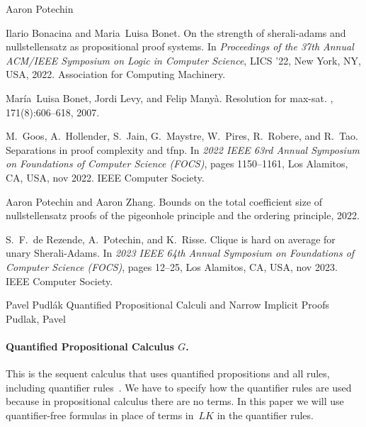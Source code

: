 \documentclass[report]{owrart}
\begin{document}
\begin{report}
\begin{talk}{Aaron Potechin}
\begin{thebibliography}{99}
Ilario Bonacina and Maria~Luisa Bonet.
\newblock On the strength of sherali-adams and nullstellensatz as propositional
  proof systems.
\newblock In {\em Proceedings of the 37th Annual ACM/IEEE Symposium on Logic in
  Computer Science}, LICS '22, New York, NY, USA, 2022. Association for
  Computing Machinery.

María~Luisa Bonet, Jordi Levy, and Felip Manyà.
\newblock Resolution for max-sat.
, 171(8):606--618, 2007.

M.~Goos, A.~Hollender, S.~Jain, G.~Maystre, W.~Pires, R.~Robere, and R.~Tao.
\newblock Separations in proof complexity and tfnp.
\newblock In {\em 2022 IEEE 63rd Annual Symposium on Foundations of Computer
  Science (FOCS)}, pages 1150--1161, Los Alamitos, CA, USA, nov 2022. IEEE
  Computer Society.

Aaron Potechin and Aaron Zhang.
\newblock Bounds on the total coefficient size of nullstellensatz proofs of the
  pigeonhole principle and the ordering principle, 2022.

S.~F.~de Rezende, A.~Potechin, and K.~Risse.
\newblock Clique is hard on average for unary Sherali-Adams.
\newblock In {\em 2023 IEEE 64th Annual Symposium on Foundations of Computer
  Science (FOCS)}, pages 12--25, Los Alamitos, CA, USA, nov 2023. IEEE Computer
  Society.

\end{thebibliography}

\end{talk}


\begin{talk}{Pavel Pudl\'ak}
  {Quantified Propositional Calculi and Narrow Implicit Proofs}
  {Pudlak, Pavel}
  
  \noindent
 
  \paragraph{\textbf{Quantified Propositional Calculus $G$.}} This is the sequent calculus that uses quantified propositions and all rules, including quantifier rules~\cite{krajicek-pudlak}. We have to specify how the quantifier rules are used because in propositional calculus there are no terms. In this paper we will use quantifier-free formulas in place of terms in~$LK$ in the quantifier rules. %


\end{talk}
\end{report}
\end{document}
